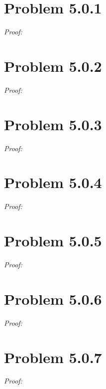 \documentclass[11pt]{article}
\theoremstyle{definition}
\theoremstyle{remark}
\theoremstyle{problem}
\begin{document}
\section{Problem 5.0.1}
\textit{Proof:} 
\newpage

\section{Problem 5.0.2}
\textit{Proof:} 
\newpage

\section{Problem 5.0.3}
\textit{Proof:} 
\newpage

\section{Problem 5.0.4}
\textit{Proof:} 
\newpage

\section{Problem 5.0.5}
\textit{Proof:} 
\newpage

\section{Problem 5.0.6}
\textit{Proof:} 
\newpage

\section{Problem 5.0.7}
\textit{Proof:} 
\newpage
\end{document}
